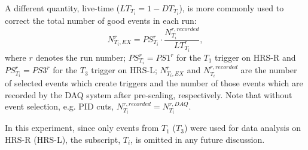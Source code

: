   A different quantity, live-time ($LT_{T_{i}} = 1 -DT_{T_{i}}$), is more commonly used to correct the total number of good events in each run:
 \begin{equation}
  N^{r}_{T_{i},EX} = PS^{r}_{T_{i}}\cdot \frac{N^{r,recorded}_{T_{i}}}{LT^{r}_{T_{i}}},
  \label{eq_lt}
 \end{equation}
where $r$ denotes the run number; $PS^{r}_{T_{i}}=PS1^{r}$ for the $T_{1}$ trigger on HRS-R and $PS^{r}_{T_{i}}=PS3^{r}$ for the $T_{3}$ trigger on HRS-L; $N^{r}_{T_{i},EX}$ and $N^{r,recorded}_{T_{i}}$ are the number of selected events which create triggers and the number of those events which are recorded by the DAQ system after pre-scaling, respectively. Note that without event selection, e.g. PID cuts, $N^{r,recorded}_{T_{i}}=N^{r,DAQ}_{T_{i}}$.

 In this experiment, since only events from $T_{1}$ ($T_{3}$) were used for data analysis on HRS-R (HRS-L), the subscript, $T_{i}$, is omitted in any future discussion.
